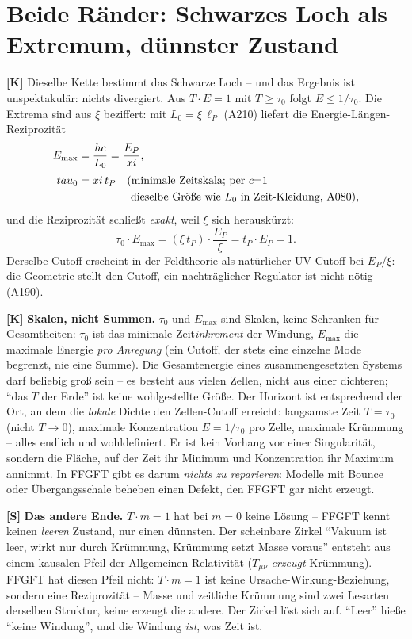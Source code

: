 \section{Beide Ränder: Schwarzes Loch als Extremum, dünnster Zustand}

\textbf{[K]} Dieselbe Kette bestimmt das Schwarze Loch -- und das Ergebnis ist
unspektakulär: nichts divergiert. Aus $T\cdot E=1$ mit $T\ge \tau_0$ folgt
$E\le 1/\tau_0$. Die Extrema sind aus $\xi$ beziffert: mit $L_0=\xi\,\ell_P$ (A210)
liefert die Energie-Längen-Reziprozität
\begin{align}
  E_\text{max} &= \frac{\hbar c}{L_0} = \frac{E_P}{\xi}, \notag\\[2pt]
  \tau_0 &= \xi\,t_P
    \quad\begin{aligned}[t]&(\text{minimale Zeitskala; per }c{=}1\\
    &\text{ dieselbe Größe wie }L_0\text{ in Zeit-Kleidung, A080}),\end{aligned} \notag
\end{align}
und die Reziprozität schließt \emph{exakt}, weil $\xi$ sich herauskürzt:
\[
  \tau_0\cdot E_\text{max} = (\xi\,t_P)\cdot\frac{E_P}{\xi} = t_P\cdot E_P = 1.
\]
Derselbe Cutoff erscheint in der Feldtheorie als natürlicher UV-Cutoff bei
$E_P/\xi$: die Geometrie stellt den Cutoff, ein nachträglicher Regulator ist nicht
nötig (A190).

\textbf{[K]} \textbf{Skalen, nicht Summen.} $\tau_0$ und $E_\text{max}$ sind Skalen,
keine Schranken für Gesamtheiten: $\tau_0$ ist das minimale Zeit\emph{inkrement} der
Windung, $E_\text{max}$ die maximale Energie \emph{pro Anregung} (ein Cutoff, der
stets eine einzelne Mode begrenzt, nie eine Summe). Die Gesamtenergie eines
zusammengesetzten Systems darf beliebig groß sein -- es besteht aus vielen Zellen,
nicht aus einer dichteren; \enquote{das $T$ der Erde} ist keine wohlgestellte
Größe. Der Horizont ist entsprechend der Ort, an dem die \emph{lokale} Dichte den
Zellen-Cutoff erreicht: langsamste Zeit $T=\tau_0$ (nicht $T\to0$), maximale
Konzentration $E=1/\tau_0$ pro Zelle, maximale Krümmung -- alles endlich und
wohldefiniert. Er ist kein Vorhang vor einer Singularität, sondern die Fläche, auf
der Zeit ihr Minimum und Konzentration ihr Maximum annimmt. In FFGFT gibt es
darum \emph{nichts zu reparieren}: Modelle mit Bounce oder Übergangsschale beheben
einen Defekt, den FFGFT gar nicht erzeugt.

\textbf{[S]} \textbf{Das andere Ende.} $T\cdot m=1$ hat bei $m=0$ keine Lösung --
FFGFT kennt keinen \emph{leeren} Zustand, nur einen dünnsten. Der scheinbare
Zirkel \enquote{Vakuum ist leer, wirkt nur durch Krümmung, Krümmung setzt Masse
voraus} entsteht aus einem kausalen Pfeil der Allgemeinen Relativität ($T_{\mu\nu}$
\emph{erzeugt} Krümmung). FFGFT hat diesen Pfeil nicht: $T\cdot m=1$ ist keine
Ursache-Wirkung-Beziehung, sondern eine Reziprozität -- Masse und zeitliche
Krümmung sind zwei Lesarten derselben Struktur, keine erzeugt die andere. Der
Zirkel löst sich auf. \enquote{Leer} hieße \enquote{keine Windung}, und die
Windung \emph{ist}, was Zeit ist.

